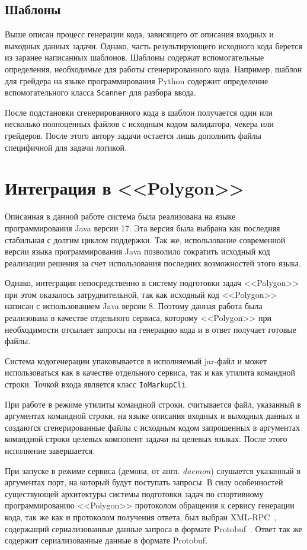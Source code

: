 \documentclass[times,specification,annotation]{style/itmo-student-thesis/itmo-student-thesis}
\begin{document}
\subsection{Шаблоны}

Выше описан процесс генерации кода, зависящего от описания входных и выходных данных задачи. Однако, часть результирующего исходного кода берется из заранее написанных шаблонов. Шаблоны содержат вспомогательные определения, необходимые для работы сгенерированного кода. Например, шаблон для грейдера на языке программирования Python содержит определение вспомогательного класса \texttt{Scanner} для разбора ввода.

После подстановки сгенерированного кода в шаблон получается один или несколько полноценных файлов с исходным кодом валидатора, чекера или грейдеров. После этого автору задачи остается лишь дополнить файлы специфичной для задачи логикой.

\section{Интеграция в <<Polygon>>}

Описанная в данной работе система была реализована на языке программирования Java версии 17. Эта версия была выбрана как последняя стабильная с долгим циклом поддержки. Так же, использование современной версии языка программирования Java позволило сократить исходный код реализации решения за счет использования последних возможностей этого языка.

Однако, интеграция непосредственно в систему подготовки задач <<Polygon>> при этом оказалось затруднительной, так как исходный код <<Polygon>> написан с использованием Java версии 8. Поэтому данная работа была реализована в качестве отдельного сервиса, которому <<Polygon>> при необходимости отсылает запросы на генерацию кода и в ответ получает готовые файлы.

Система кодогенерации упаковывается в исполняемый jar-файл и может использоваться как в качестве отдельного сервиса, так и как утилита командной строки. Точкой входа является класс \texttt{IoMarkupCli}.

При работе в режиме утилиты командной строки, считывается файл, указанный в аргументах командной строки, на языке описания входных и выходных данных и создаются сгенерированные файлы с исходным кодом запрошенных в аргументах командной строки целевых компонент задачи на целевых языках. После этого исполнение завершается.

При запуске в режиме сервиса (демона, от англ. \textit{daemon}) слушается указанный в аргументах порт, на который будут поступать запросы. В силу особенностей существующей архитектуры системы подготовки задач по спортивному программированию <<Polygon>> протоколом обращения к сервису генерации кода, так же как и протоколом получения ответа, был выбран XML-RPC~\cite{laurent2001programming}, содержащий сериализованные данные запроса в формате Protobuf~\cite{protobufdocs}. Ответ так же содержит сериализованные данные в формате Protobuf.
\end{document}
